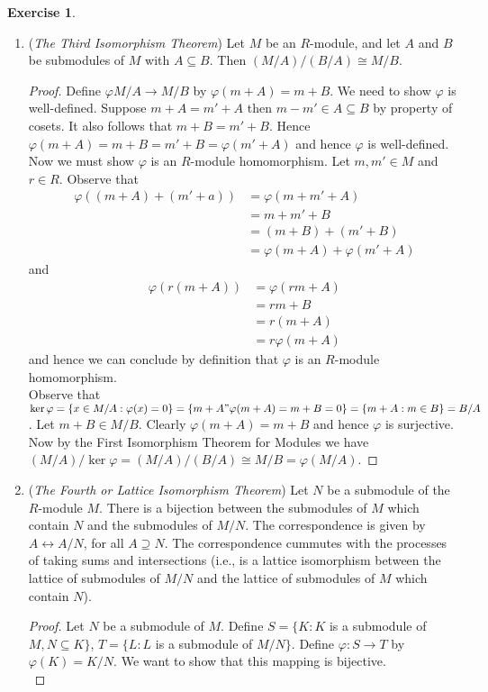 \documentclass[8pt]{amsart}
\theoremstyle{plain}%
\theoremstyle{definition}
\newtheorem*{exercise}{Exercise}%
\theoremstyle{remark}
\numberwithin{equation}{section}
\begin{document}
\begin{exercise}
\begin{enumerate}
\begin{proof}
			\end{proof}
		\item (\textit{The Third Isomorphism Theorem}) Let $M$ be an $R$-module, and let $A$ and $B$ be submodules of $M$ with $A \subseteq B$. Then $(M/A)/(B/A) \cong M/B$.
			\begin{proof}
				Define $\varphi M/A \to M/B$ by $\varphi(m + A) = m + B$. We need to show $\varphi$ is well-defined. Suppose $m + A = m' + A$ then $m - m' \in A \subseteq B$ by property of cosets. It also follows that $m + B = m' + B$. Hence $\varphi(m + A) = m + B = m' + B = \varphi(m' + A)$ and hence $\varphi$ is well-defined.\\

				Now we must show $\varphi$ is an $R$-module homomorphism. Let $m, m' \in M$ and $r \in R$. Observe that
				\begin{align*}
					\varphi((m + A) + (m' + a)) &= \varphi(m + m' + A)\\
					&= m + m' + B\\
					&= (m + B) + (m' + B)\\
					&= \varphi(m + A) + \varphi(m' + A)
				\end{align*}
				and
				\begin{align*}
					\varphi(r(m + A)) &= \varphi(rm + A)\\
					&= rm + B\\
					&= r(m + A)\\
					&= r\varphi(m + A)
				\end{align*}
				and hence we can conclude by definition that $\varphi$ is an $R$-module homomorphism.\\

				Observe that $\ker \varphi = \{x \in M/A : \varphi(x) = 0\} = \{m + A " \varphi(m + A) = m + B = 0\} = \{m + A : m \in B\} = B/A$. Let $m + B \in M/B$. Clearly $\varphi(m + A) = m + B$ and hence $\varphi$ is surjective. Now by the First Isomorphism Theorem for Modules we have $(M/A)/\ker \varphi = (M/A)/(B/A) \cong M/B = \varphi(M/A)$.
			\end{proof}
		\item (\textit{The Fourth or Lattice Isomorphism Theorem}) Let $N$ be a submodule of the $R$-module $M$. There is a bijection between the submodules of $M$ which contain $N$ and the submodules of $M/N$. The correspondence is given by $A \leftrightarrow A/N$, for all $A \supseteq N$. The correspondence cummutes with the processes of taking sums and intersections (i.e., is a lattice isomorphism between the lattice of submodules of $M/N$ and the lattice of submodules of $M$ which contain $N$).
			\begin{proof}
				Let $N$ be a submodule of $M$. Define $S = \{K : K$ is a submodule of $M, N \subseteq K\}$, $T = \{L : L$ is a submodule of $M/N\}$. Define $\varphi : S \to T$ by $\varphi(K) = K/N$. We want to show that this mapping is bijective.\\


\end{proof}
\end{enumerate}
\end{exercise}
\end{document}

